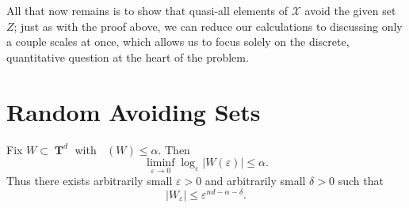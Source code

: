 \documentclass[12pt,reqno]{article}
\DeclareMathOperator{\lowminkdim}{\underline{\dim}_{\mathbf{M}}}
\DeclareMathOperator{\TT}{\mathbf{T}}
\begin{document}
All that now remains is to show that quasi-all elements of $\mathcal{X}$ avoid the given set $Z$; just as with the proof above, we can reduce our calculations to discussing only a couple scales at once, which allows us to focus solely on the discrete, quantitative question at the heart of the problem.

\section{Random Avoiding Sets}

Fix $W \subset \TT^d$ with $\lowminkdim(W) \leq \alpha$. Then
%
\[ \liminf_{\varepsilon \to 0} \log_\varepsilon |W(\varepsilon)| \leq \alpha. \]
%
Thus there exists arbitrarily small $\varepsilon > 0$ and arbitrarily small $\delta > 0$ such that
%
\[ |W_\varepsilon| \leq \varepsilon^{nd - \alpha - \delta}. \]
\end{document}
